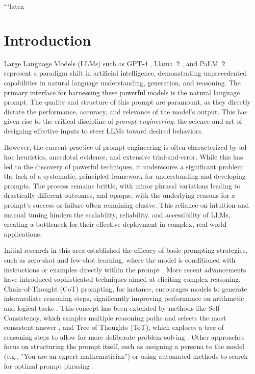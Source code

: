 \documentclass{article}
\begin{document}
\maketitle

```latex
\section{Introduction}
\label{sec:introduction}

Large Language Models (LLMs) such as GPT-4 \cite{OpenAI2023}, Llama~2 \cite{Touvron2023}, and PaLM~2 \cite{Anil2023} represent a paradigm shift in artificial intelligence, demonstrating unprecedented capabilities in natural language understanding, generation, and reasoning. The primary interface for harnessing these powerful models is the natural language prompt. The quality and structure of this prompt are paramount, as they directly dictate the performance, accuracy, and relevance of the model's output. This has given rise to the critical discipline of \textit{prompt engineering}: the science and art of designing effective inputs to steer LLMs toward desired behaviors.

However, the current practice of prompt engineering is often characterized by ad-hoc heuristics, anecdotal evidence, and extensive trial-and-error. While this has led to the discovery of powerful techniques, it underscores a significant problem: the lack of a systematic, principled framework for understanding and developing prompts. The process remains brittle, with minor phrasal variations leading to drastically different outcomes, and opaque, with the underlying reasons for a prompt's success or failure often remaining elusive. This reliance on intuition and manual tuning hinders the scalability, reliability, and accessibility of LLMs, creating a bottleneck for their effective deployment in complex, real-world applications.

Initial research in this area established the efficacy of basic prompting strategies, such as zero-shot and few-shot learning, where the model is conditioned with instructions or examples directly within the prompt \cite{Brown2020}. More recent advancements have introduced sophisticated techniques aimed at eliciting complex reasoning. Chain-of-Thought (CoT) prompting, for instance, encourages models to generate intermediate reasoning steps, significantly improving performance on arithmetic and logical tasks \cite{Wei2022}. This concept has been extended by methods like Self-Consistency, which samples multiple reasoning paths and selects the most consistent answer \cite{Wang2022a}, and Tree of Thoughts (ToT), which explores a tree of reasoning steps to allow for more deliberate problem-solving \cite{Yao2023}. Other approaches focus on structuring the prompt itself, such as assigning a persona to the model (e.g., "You are an expert mathematician") or using automated methods to search for optimal prompt phrasing \cite{Zhou2022}.
\end{document}

